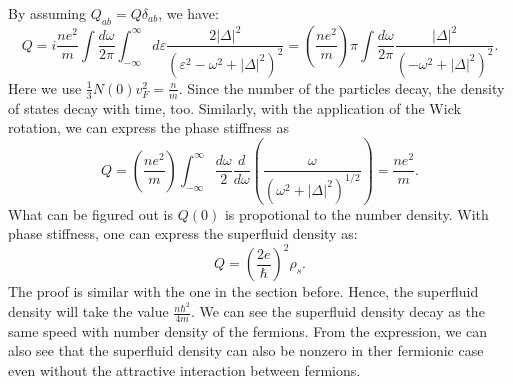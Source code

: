 \documentclass[aps,onecolumn,superscriptaddress,notitlepage,longbibliography]{revtex4-1}
\begin{document}
By assuming $Q_{a b} = Q \delta_{a b}$, we have:
\begin{equation}
  Q = i\frac{n e^2}{m} \int\frac{d\omega}{2\pi} \int_{- \infty}^{\infty} d
  \varepsilon \frac{2 | \Delta |^2}{(\varepsilon^2 -\omega^2 + | \Delta
  |^2)^2} = \left( \frac{n e^2}{m} \right) \pi \int\frac{d\omega}{2\pi} \frac{|
  \Delta |^2}{(-\omega^2+ | \Delta |^2)^2}.
\end{equation}
Here we use $\frac{1}{3} N (0) v_F^2 = \frac{n}{m}$. Since the number of the particles decay, the density of states decay with time, too. Similarly, with the application of the Wick rotation, we can express the phase stiffness as
\begin{equation}
  Q = \left( \frac{n e^2}{m} \right) \int_{- \infty}^{\infty} \frac{d
  \omega}{2} \frac{d}{d \omega} \left( \frac{\omega}{(\omega^2 + | \Delta
  |^2)^{1 / 2}} \right) = \frac{n e^2}{m}.
\end{equation}
What can be figured out is $Q (0)$ is propotional to the number density. With
phase stiffness, one can express the superfluid density as:
\begin{equation}
  Q = \left( \frac{2 e}{\hbar} \right)^2 \rho_s.
\end{equation}
The proof is similar with the one in the section before. Hence, the superfluid density will take the value $\frac{n \hbar^2}{4 m}$. We can see the superfluid density decay as the same speed with number density of the fermions. From the expression, we can also see that the superfluid density can also be nonzero in ther fermionic case even without the attractive interaction between fermions.
\end{document}
